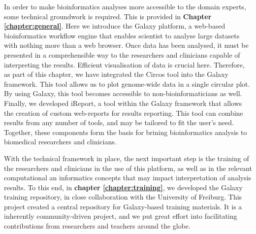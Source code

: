 In order to make bioinformatics analyses more accessible to the domain experts, some technical groundwork is required. This is provided in
\textbf{Chapter \ref{chapter:general}}. Here we introduce the Galaxy platform, a web-based bioinformatics workflow engine that enables scientist to analyse large datasets with nothing more than a web browser.
Once data has been analysed, it must be presented in a comprehensible way to the researchers and clinicians capable of interpreting the results. Efficient visualisation of data is crucial here.
Therefore, as part of this chapter, we have integrated the Circos tool into the Galaxy framework. This tool allows us to plot genome-wide data in a single circular plot. By using Galaxy, this tool becomes accessible to non-bioinformaticians as well.
Finally, we developed iReport, a tool within the Galaxy framework that allows the creation of custom web-reports for results reporting. This tool can combine results from any number of tools, and may be tailored to fit the user's need. Together, these components form the basis for brining bioinformatics analysis to biomedical researchers and clinicians.

With the technical framework in place, the next important step is the training of the researchers and clinicians in the use of this platform, as well as in the relevant computational an informatics concepts that may impact interpretation of analysis results.
To this end, in \textbf{chapter \ref{chapter:training}}, we developed the Galaxy training repository, in close collaboration with the University of Freiburg. This project created a central repository for Galaxy-based training materials. It is a inherently community-driven project, and we put great effort into facilitating contributions from researchers and teachers around the globe.


